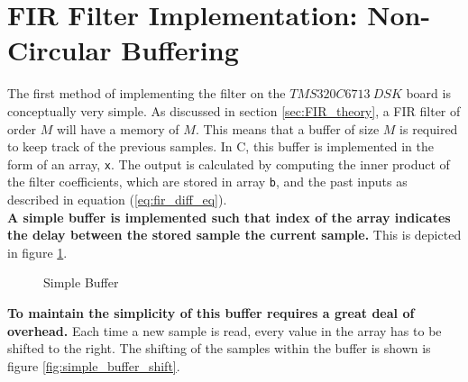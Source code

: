 \documentclass{article}
\begin{document}
\newpage
\section{FIR Filter Implementation: Non-Circular Buffering}
The first method of implementing the filter on the $TMS320C6713 \ DSK$ board is conceptually very simple. As discussed in section \ref{sec:FIR_theory}, a FIR filter of order $M$ will have a memory of $M$. This means that a buffer of size $M$ is required to keep track of the previous samples. In C, this buffer is implemented in the form of an array, {\tt x}. The output is calculated by computing the inner product of the filter coefficients, which are stored in array {\tt b}, and the past inputs as described in equation (\ref{eq:fir_diff_eq}).\\

\textbf{A simple buffer is implemented such that index of the array indicates the delay between the stored sample the current sample.} This is depicted in figure \ref{fig:simple_buffer}.\\

\begin{figure}[H]
\centering
{}
\caption{Simple Buffer}
\label{fig:simple_buffer}
\end{figure}

\textbf{To maintain the simplicity of this buffer requires a great deal of overhead.} Each time a new sample is read, every value in the array has to be shifted to the right. The shifting of the samples within the buffer is shown is figure \ref{fig:simple_buffer_shift}.\\
\end{document}
